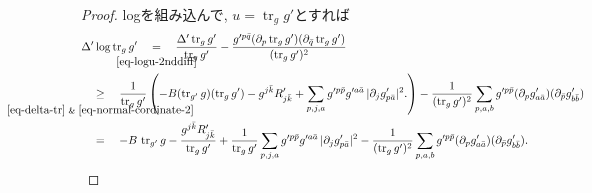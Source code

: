 \documentclass[dvipdfmx,a4paper,11pt]{article} %
\theoremstyle{definition}
\theoremstyle{remark}
\numberwithin{equation}{section}
\newcommand{\underalign}[2]{%
  \quad
  \underset{\mathclap{\raisebox{-1.6ex}{\ensuremath{\scriptstyle #1}}}}{#2}
  \quad
}
\begin{document}
\begin{proof}
logを組み込んで, $u=\operatorname{tr}_g g'$とすれば
\begin{equation}
\begin{aligned}
\label{eq-logtr-lap}
&\Delta'\log \operatorname{tr}_g g'
\underalign{\eqref{eq-logu-2nddiff}}{=}
 \frac{\Delta'\operatorname{tr}_g g'}{\operatorname{tr}_g g'}
- \frac{g'^{p\bar q}(\partial_p\operatorname{tr}_g g')(\partial_{\bar q}\operatorname{tr}_g g')}{(\operatorname{tr}_g g')^2}
\\
&\underalign{\eqref{eq-delta-tr} \text{ \& } \eqref{eq-normal-cordinate-2}}{\geq}
\frac{1}{\operatorname{tr}_g g'}
\left( 
 -B(\operatorname{tr}_{g'}g)(\operatorname{tr}_g g')-g^{j\bar k}R'_{j\bar k}
+\sum_{p,j,a} g'^{p\bar p}g'^{a\bar a}\,\lvert\partial_j g'_{p\bar a}\rvert^2.
\right)
-\frac{1}{(\operatorname{tr}_g g')^2}\sum_{p,a,b} g'^{p\bar p}(\partial_p g'_{a\bar a})(\partial_{\bar p}g'_{b\bar b})
\\
&\underalign{\text{}}{=}
 -B\,\operatorname{tr}_{g'}g-\frac{g^{j\bar k}R'_{j\bar k}}{\operatorname{tr}_g g'}
+\frac{1}{\operatorname{tr}_g g'}\sum_{p,j,a} g'^{p\bar p}g'^{a\bar a}\,\lvert\partial_j g'_{p\bar a}\rvert^2
-\frac{1}{(\operatorname{tr}_g g')^2}\sum_{p,a,b} g'^{p\bar p}(\partial_p g'_{a\bar a})(\partial_{\bar p}g'_{b\bar b}).
\end{aligned}
\end{equation}


\end{proof}
\end{document}

